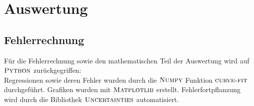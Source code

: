 \documentclass[
  bibliography=totoc,     %
  captions=tableheading,  %
  titlepage=firstiscover, %
]{scrartcl}
\begin{document}
\section{Auswertung}
\label{sec:auswertung}
\subsection{Fehlerrechnung}
Für die Fehlerrechnung sowie den mathematischen Teil der Auswertung wird auf
$\textsc{Python}$ zurückgegriffen:\\
Regressionen sowie deren Fehler wurden durch die $\textsc{Numpy}$ \cite{numpy} Funktion
$\textsc{curve-fit}$ durchgeführt. Grafiken wurden mit $\textsc{Matplotlib}$ \cite{matplotlib}
erstellt.
Fehlerfortpflanzung wird durch die Bibliothek
$\textsc{Uncertainties}$ \cite{uncertainties} automatisiert.
\end{document}
